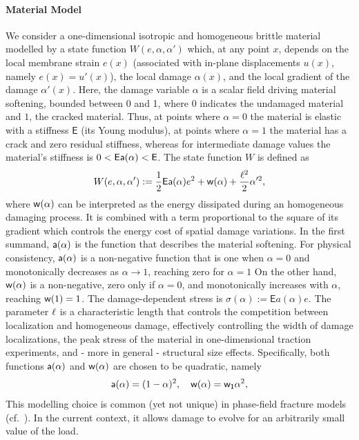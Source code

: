 \documentclass[10pt]{article}
\begin{document}
\paragraph{Material Model}
We consider a one-dimensional isotropic and homogeneous brittle material modelled by a state function $W(e, \alpha, \alpha')$ which, at any point $x$,
%
depends on the local membrane strain $e(x)$ (associated with  in-plane displacements $u(x)$, namely $e(x) = u'(x)$), the local damage $\alpha(x)$, and the local gradient of the damage $\alpha'(x)$. 
Here, the damage variable $\alpha$ is a scalar field driving material softening, bounded between 0 and 1, where $0$ indicates the undamaged material and $1$, the cracked material. Thus, at points where $\alpha=0$ the material is elastic with a stiffness $\mathsf{E}$ (its Young modulus), at points where $\alpha=1$ the material has a crack and zero residual stiffness, whereas for intermediate damage values the material's stiffness is $0<\mathsf{E}\mathsf{a}(\alpha)< \mathsf{E}$.  
The state function $W$ is defined as 
\begin{equation}
    \label{def:energy_material}
    W(e, \alpha, \alpha'):= \frac{1}{2} \mathsf{E} \mathsf{a}(\alpha)e^2 +\mathsf{w}(\alpha) + \frac{\ell^2}{2}\alpha'^2,
\end{equation}
where $\mathsf{w}(\alpha)$ can be interpreted as the energy dissipated during an homogeneous damaging process. It is combined with a term proportional to the square of its gradient which controls the energy cost of spatial damage variations. In the first summand, $\mathsf{a}(\alpha)$ is the function that describes the material softening. %
For physical consistency, $\mathsf{a}(\alpha)$ is a non-negative function that is one when $\alpha=0$ and monotonically decreases as $\alpha\to 1$, reaching zero for $\alpha=1$  
On the other hand, $\mathsf{w}(\alpha)$ is a non-negative, zero only if $\alpha=0$, and monotonically increases with $\alpha$, reaching $\mathsf{w}(1)=1$. 
The damage-dependent stress is $\sigma(\alpha):=\mathsf{E}a(\alpha) e$. The parameter $\ell$ is a characteristic length that controls the competition between localization and homogeneous damage, effectively controlling the width of damage localizations, the peak stress of the material in one-dimensional traction experiments, and - more in general - structural size effects.
Specifically, both functions $\mathsf{a}(\alpha)$  
%
 and $\mathsf{w}(\alpha)$ are chosen to be quadratic, namely 
%
\begin{equation}
    \label{def:constitutive_functions}
    \mathsf{a}(\alpha) = (1-\alpha)^2, \quad \mathsf{w}(\alpha) = \mathsf{w_1}\alpha^2,
\end{equation}
This modelling choice is common (yet not unique) in phase-field fracture models (cf.~\cite{Bourdin2000-pc,Miehe2010-sj,Miehe2010-ja}). In the current context, it allows damage to evolve for an arbitrarily small value of the load. 
%
\end{document}

